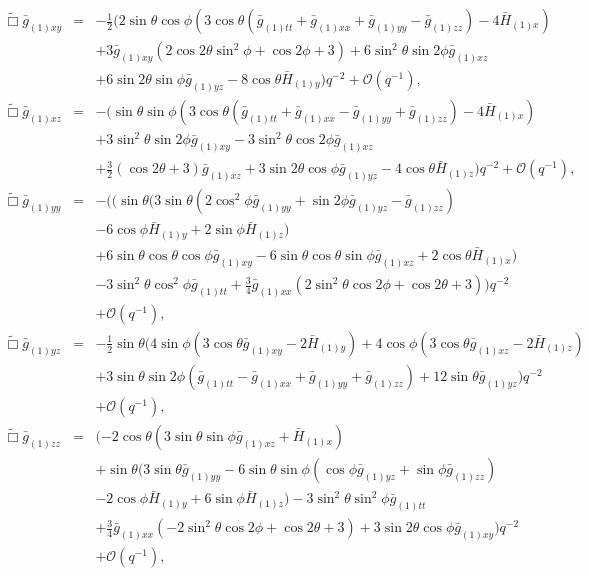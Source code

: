 \documentclass[a4paper,11pt]{article}
\numberwithin{equation}{section}
\begin{document}
\begin{eqnarray}
%
\label{eqn:efexy}
\tilde{\Box}\bar{g}_{(1)xy}&=&-\frac{1}{2} (2 \sin \theta  \cos \phi  (3 \cos \theta (\bar{g}_{(1)tt}+\bar{g}_{(1)xx}+\bar{g}_{(1)yy}-\bar{g}_{(1)zz})-4 \bar{H}_{(1) x}) \nonumber \\
&&+3 \bar{g}_{(1)xy} (2 \cos 2\theta  \sin ^2\phi +\cos 2 \phi +3)+6 \sin ^2\theta  \sin 2 \phi 
   \bar{g}_{(1)xz} \nonumber \\
   &&+6 \sin 2 \theta  \sin \phi  \bar{g}_{(1)yz}-8 \cos
   \theta  \bar{H}_{(1) y})    q^{-2} +\mathcal{O}(q^{-1}),\\
%
\label{eqn:efexz}
\tilde{\Box}\bar{g}_{(1)xz}&=&- (\sin \theta  \sin \phi  (3 \cos \theta  (\bar{g}_{(1)tt}+\bar{g}_{(1)xx}-\bar{g}_{(1)yy}+\bar{g}_{(1)zz})-4
   \bar{H}_{(1) x}) \nonumber \\
   &&+3 \sin ^2\theta \sin 2 \phi  \bar{g}_{(1)xy}-3 \sin
   ^2\theta  \cos 2 \phi  \bar{g}_{(1)xz} \nonumber \\
   &&+\frac{3}{2} (\cos 2 \theta +3)
   \bar{g}_{(1)xz}+3 \sin 2 \theta  \cos \phi  \bar{g}_{(1)yz}-4 \cos
   \theta  \bar{H}_{(1)z})    q^{-2} +\mathcal{O}(q^{-1}),\\
%
\label{eqn:efeyy}
\tilde{\Box}\bar{g}_{(1)yy}&=&-( (\sin \theta (3 \sin \theta  (2 \cos ^2\phi  \bar{g}_{(1)yy}+\sin 2 \phi  \bar{g}_{(1)yz}-\bar{g}_{(1)zz}) \nonumber \\
&&-6 \cos\phi \bar{H}_{(1) y}+2 \sin \phi  \bar{H}_{(1) z}) \nonumber \\
&&+6 \sin \theta \cos
   \theta \cos \phi  \bar{g}_{(1)xy}-6 \sin \theta  \cos \theta  \sin   \phi  \bar{g}_{(1)xz}+2 \cos \theta  \bar{H}_{(1) x}) \nonumber \\
   &&-3 \sin ^2\theta \cos ^2\phi  \bar{g}_{(1)tt}+\frac{3}{4} \bar{g}_{(1)xx} (2 \sin ^2\theta  \cos 2 \phi +\cos 2 \theta +3)  )  q^{-2} \nonumber \\
&&+\mathcal{O}(q^{-1}),\\
%
\label{eqn:efeyz}
\tilde{\Box}\bar{g}_{(1)yz}&=&-\frac{1}{2} \sin \theta (4 \sin \phi  (3 \cos \theta  \bar{g}_{(1)xy}-2 \bar{H}_{(1) y})+4 \cos \phi  (3 \cos \theta  \bar{g}_{(1)xz}-2 \bar{H}_{(1) z}) \nonumber \\
&&+3 \sin \theta  \sin 2 \phi  (\bar{g}_{(1)tt}-\bar{g}_{(1)xx}+\bar{g}_{(1)yy}+\bar{g}_{(1)zz})+12 \sin \theta  \bar{g}_{(1)yz})  q^{-2} \nonumber \\
&&+\mathcal{O}(q^{-1}),\\
%
\label{eqn:efezz}
\tilde{\Box}\bar{g}_{(1)zz}&=&(-2 \cos \theta  (3 \sin \theta  \sin \phi  \bar{g}_{(1)xz}+\bar{H}_{(1)x}) \nonumber \\
&&+ \sin \theta  (3 \sin \theta  \bar{g}_{(1)yy}-6 \sin\theta  \sin \phi  (\cos \phi  \bar{g}_{(1)yz}+\sin \phi 
   \bar{g}_{(1)zz}) \nonumber \\
   &&-2 \cos \phi  \bar{H}_{(1) y} +6 \sin \phi  \bar{H}_{(1)z}) -3  \sin ^2\theta  \sin ^2\phi  \bar{g}_{(1)tt} \nonumber \\
   &&+\frac{3}{4}  \bar{g}_{(1)xx} (-2 \sin ^2\theta  \cos 2 \phi +\cos 2 \theta
   +3) +3 \sin 2 \theta  \cos \phi  \bar{g}_{(1)xy})  q^{-2} \nonumber \\
&&+\mathcal{O}(q^{-1}),
\end{eqnarray}
\end{document}
